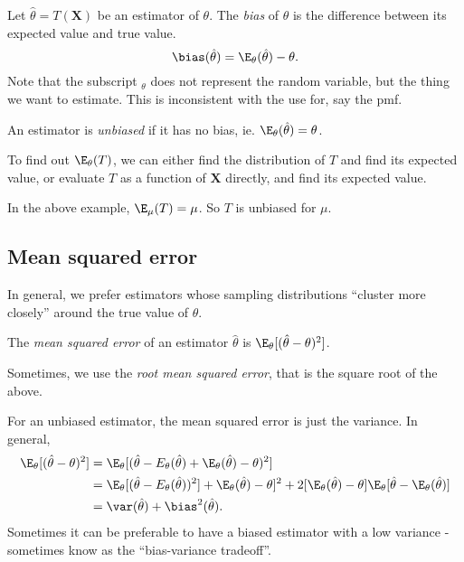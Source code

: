 \documentclass[a4paper]{article}
\begin{document}
\begin{defi}[Bias]
  Let $\hat{\theta} = T(\mathbf{X})$ be an estimator of $\theta$. The \emph{bias} of $\hat{\theta}$ is the difference between its expected value and true value.
  \[
    \bias(\hat{\theta}) = \E_\theta(\hat{\theta}) - \theta.
  \]
  Note that the subscript $_\theta$ does not represent the random variable, but the thing we want to estimate. This is inconsistent with the use for, say the pmf.

  An estimator is \emph{unbiased} if it has no bias, ie. $\E_\theta(\hat{\theta}) = \theta$.
\end{defi}
To find out $\E_\theta (T)$, we can either find the distribution of $T$ and find its expected value, or evaluate $T$ as a function of $\mathbf{X}$ directly, and find its expected value. 

\begin{eg}
  In the above example, $\E_\mu(T) =\mu$. So $T$ is unbiased for $\mu$. 
\end{eg}
\subsection{Mean squared error}
In general, we prefer estimators whose sampling distributions ``cluster more closely'' around the true value of $\theta$.
\begin{defi}
  The \emph{mean squared error} of an estimator $\hat{\theta}$ is $\E_\theta[(\hat{\theta} - \theta)^2]$.

  Sometimes, we use the \emph{root mean squared error}, that is the square root of the above.
\end{defi}
For an unbiased estimator, the mean squared error is just the variance. In general,
\begin{align*}
  \E_\theta[(\hat{\theta} - \theta)^2] &= \E_\theta[(\hat{\theta} - E_\theta(\hat{\theta}) + \E_\theta(\hat{\theta}) - \theta)^2]\\
  &= \E_\theta[(\hat{\theta} - E_\theta(\hat{\theta}))^2] + \E_\theta(\hat{\theta}) - \theta]^2 + 2[\E_\theta(\hat{\theta}) - \theta]\E_\theta[\hat{\theta} - \E_\theta(\hat{\theta})]\\
  &= \var(\hat{\theta}) + \bias^2(\hat{\theta}).
\end{align*}
Sometimes it can be preferable to have a biased estimator with a low variance - sometimes know as the ``bias-variance tradeoff''.
\end{document}
